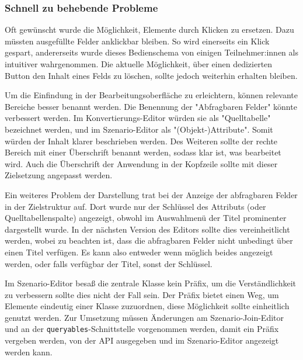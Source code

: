 
\subsubsection{Schnell zu behebende Probleme}

Oft gewünscht wurde die Möglichkeit, Elemente durch Klicken zu ersetzen. Dazu müssten ausgefüllte Felder anklickbar bleiben. So wird einerseits ein Klick gespart, andererseits wurde dieses Bedienschema von einigen Teilnehmer:innen als intuitiver wahrgenommen. Die aktuelle Möglichkeit, über einen dedizierten Button den Inhalt eines Felds zu löschen, sollte jedoch weiterhin erhalten bleiben.

Um die Einfindung in der Bearbeitungsoberfläche zu erleichtern, können relevante Bereiche besser benannt werden. Die Benennung der "Abfragbaren Felder" könnte verbessert werden. Im Konvertierungs-Editor würden sie als "Quelltabelle" bezeichnet werden, und im Szenario-Editor als "(Objekt-)Attribute". Somit würden der Inhalt klarer beschrieben werden. Des Weiteren sollte der rechte Bereich mit einer Überschrift benannt werden, sodass klar ist, was bearbeitet wird. Auch die Überschrift der Anwendung in der Kopfzeile sollte mit dieser Zielsetzung angepasst werden.

Ein weiteres Problem der Darstellung trat bei der Anzeige der abfragbaren Felder in der Zielstruktur auf. Dort wurde nur der Schlüssel des Attributs (oder Quelltabellenspalte) angezeigt, obwohl im Auswahlmenü der Titel prominenter dargestellt wurde. In der nächsten Version des Editors sollte dies vereinheitlicht werden, wobei zu beachten ist, dass die abfragbaren Felder nicht unbedingt über einen Titel verfügen. Es kann also entweder wenn möglich beides angezeigt werden, oder falls verfügbar der Titel, sonst der Schlüssel.

Im Szenario-Editor besaß die zentrale Klasse kein Präfix, um die Verständlichkeit zu verbessern sollte dies nicht der Fall sein. Der Präfix bietet einen Weg, um Elemente eindeutig einer Klasse zuzuordnen, diese Möglichkeit sollte einheitlich genutzt werden. Zur Umsetzung müssen Änderungen am Szenario-Join-Editor und an der \texttt{queryables}-Schnittstelle vorgenommen werden, damit ein Präfix vergeben werden, von der \ac{API} ausgegeben und im Szenario-Editor angezeigt werden kann.

